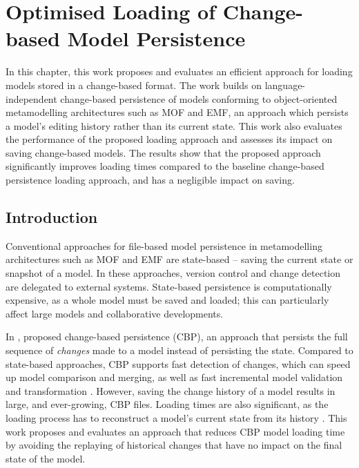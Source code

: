 \chapter{Optimised Loading of Change-based Model Persistence}
\label{ch:optimised_loading}

In this chapter, this work proposes and evaluates an efficient approach for loading models stored in a change-based format. The work builds on language-independent change-based persistence of models conforming to object-oriented metamodelling architectures such as MOF and EMF, an approach which persists a model's editing history rather than its current state. This work also evaluates the performance of the proposed loading approach and assesses its impact on saving change-based models. The results show that the proposed approach significantly improves loading times compared to the baseline change-based persistence loading approach, and has a negligible impact on saving.

\section{Introduction}
\label{sec:introduction_4}
Conventional approaches for file-based model persistence in metamodelling architectures such as MOF \cite{omg2018mof} and EMF \cite{steinberg2008emf} are state-based -- saving the current state or snapshot of a model.  In these approaches, version control and change detection are delegated to external systems. State-based persistence is computationally expensive, as a whole model must be saved and loaded; this can particularly affect large models and collaborative developments.

In \cite{DBLP:conf/models/YohannisKP17}, proposed change-based persistence (CBP), an approach that persists the full sequence of \emph{changes} made to a model instead of persisting the state. Compared to state-based approaches, CBP supports fast detection of changes, which can speed up model comparison and merging, as well as fast incremental model validation and transformation \cite{DBLP:conf/ecmdafa/RathHV12,DBLP:conf/ecmdafa/OgunyomiRK15}. However, saving the change history of a model results in large, and ever-growing, CBP files.  Loading times are also significant, as the loading process has to reconstruct a model's current state from its history \cite{DBLP:conf/models/YohannisKP17}. This work proposes and evaluates an approach that reduces CBP model loading time by avoiding the replaying of historical changes that have no impact on the final state of the model.

